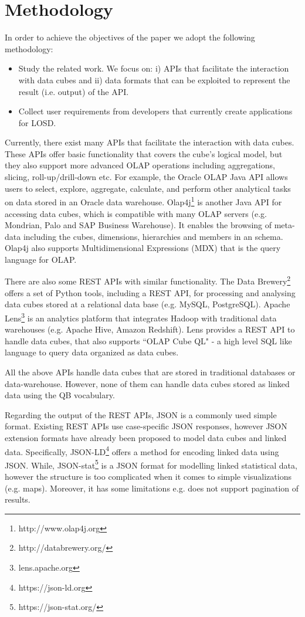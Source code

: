 \documentclass{llncs}
\begin{document}
\section{Methodology}\label{sec:methodology}

In order to achieve the objectives of the paper we adopt the following methodology:
\begin{itemize}
\item Study the related work. We focus on: i) APIs that facilitate the interaction with data cubes and ii) data formats that can be exploited to represent the result (i.e. output) of the API. 
\item Collect user requirements from developers that currently create applications for LOSD. 
\end{itemize}

Currently, there exist many APIs that facilitate the interaction with data cubes. These APIs offer basic functionality that covers the cube's logical model, but they also support more advanced OLAP operations including aggregations, slicing, roll-up/drill-down etc. For example, the Oracle OLAP Java API \cite{ORACLEAPI} allows users to select, explore, aggregate, calculate, and perform other analytical tasks on data stored in an Oracle data warehouse. Olap4j\footnote{http://www.olap4j.org} is another Java API for accessing data cubes, which is compatible with many OLAP servers (e.g. Mondrian, Palo and SAP Business Warehouse). It enables the browsing of meta-data including the cubes, dimensions, hierarchies and members in an schema. Olap4j also supports Multidimensional Expressions (MDX) that is the query language for OLAP.

There are also some REST APIs with similar functionality. The Data Brewery\footnote{http://databrewery.org/} offers a set of Python tools, including a REST API, for processing and analysing data cubes stored at a relational data base (e.g. MySQL, PostgreSQL). Apache Lens\footnote{lens.apache.org} is an analytics platform that integrates Hadoop with traditional data warehouses (e.g. Apache Hive, Amazon Redshift). Lens provides a REST API to handle data cubes, that also supports ``OLAP Cube QL" - a high level SQL like language to query data organized as data cubes.

All the above APIs handle data cubes that are stored in traditional databases or data-warehouse. However, none of them can handle data cubes  stored as linked data using the QB vocabulary.  

Regarding the output of the REST APIs, JSON is a commonly used simple format. Existing REST APIs use 
case-specific JSON responses, however JSON extension formats have already been proposed to model data cubes and linked data. Specifically, JSON-LD\footnote{https://json-ld.org} offers a method for encoding linked data using JSON. While, JSON-stat\footnote{https://json-stat.org/} is a JSON format for modelling linked statistical data, however the structure is too complicated when it comes to simple visualizations (e.g. maps). Moreover, it has some limitations e.g. does not support pagination of results. 
\end{document}
